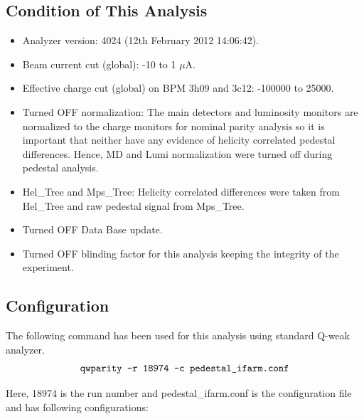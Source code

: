 \subsection{Condition of This Analysis}
\label{Condition of This Analysis}

\begin{itemize}
\item Analyzer version: 4024 (12th February 2012 14:06:42).
\item Beam current cut (global): -10 to 1 $\mu$A.
\item Effective charge cut (global) on BPM 3h09 and 3c12: -100000 to 25000.
\item Turned OFF normalization: The main detectors and luminosity monitors are normalized to the charge monitors for nominal parity analysis so it is important that neither have any evidence of helicity correlated pedestal differences. Hence, MD and Lumi normalization were turned off during pedestal analysis.
\item Hel\_Tree and Mps\_Tree: Helicity correlated differences were taken from Hel\_Tree and raw pedestal signal from Mps\_Tree.
\item Turned OFF Data Base update.
\item Turned OFF blinding factor for this analysis keeping the integrity of the experiment.~\cite{pking}
\end{itemize}

\subsection{Configuration}
\label{Configuration}

The following command has been used for this analysis using standard Q-weak analyzer.
\begin{equation} \label{equ:eqAnalysis1}
\texttt{qwparity -r 18974  -c pedestal\_ifarm.conf}\\
\end{equation}

Here, 18974 is the run number and pedestal\_ifarm.conf is the configuration file and has following configurations:

